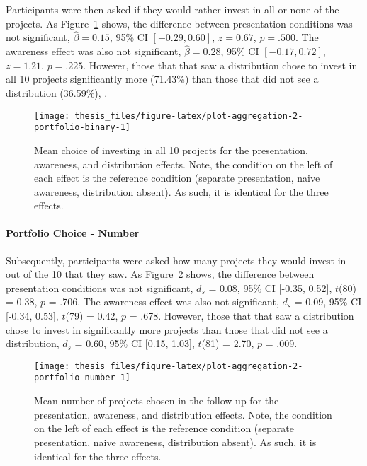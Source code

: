 \documentclass[a4paper, nobind]{templates/ociamthesis}
\theoremstyle{definition}
\theoremstyle{definition}
\theoremstyle{definition}
\theoremstyle{definition}
\theoremstyle{remark}
\begin{document}
Participants were then asked if they would rather invest in all or none of the
projects. As Figure~\ref{fig:plot-aggregation-2-portfolio-binary} shows, the
difference between presentation conditions was not significant,
\(\hat{\beta} = 0.15\), 95\% CI \([-0.29, 0.60]\), \(z = 0.67\), \(p = .500\). The
awareness effect was also not significant,
\(\hat{\beta} = 0.28\), 95\% CI \([-0.17, 0.72]\), \(z = 1.21\), \(p = .225\). However,
those that that saw a distribution chose to invest in all 10 projects
significantly more
(71.43\%) than
those that did not see a distribution
(36.59\%),
.



\begin{figure}
\texttt{[image: thesis\_files/figure-latex/plot-aggregation-2-portfolio-binary-1]} \caption{Mean choice of investing in all 10 projects for the presentation, awareness, and distribution effects. Note, the condition on the left of each effect is the reference condition (separate presentation, naive awareness, distribution absent). As such, it is identical for the three effects.}\label{fig:plot-aggregation-2-portfolio-binary}
\end{figure}

\paragraph{Portfolio Choice - Number}

Subsequently, participants were asked how many projects they would invest in out
of the 10 that they saw. As
Figure~\ref{fig:plot-aggregation-2-portfolio-number} shows, the difference
between presentation conditions was not significant,
\(d_s\) = 0.08, 95\% CI {[}-0.35, 0.52{]}, \(t\)(80) = 0.38, \(p\) = .706. The awareness effect
was also not significant, \(d_s\) = 0.09, 95\% CI {[}-0.34, 0.53{]}, \(t\)(79) = 0.42, \(p\) = .678.
However, those that that saw a distribution chose to invest in significantly
more projects than those that did not see a distribution,
\(d_s\) = 0.60, 95\% CI {[}0.15, 1.03{]}, \(t\)(81) = 2.70, \(p\) = .009.



\begin{figure}
\texttt{[image: thesis\_files/figure-latex/plot-aggregation-2-portfolio-number-1]} \caption{Mean number of projects chosen in the follow-up for the presentation, awareness, and distribution effects. Note, the condition on the left of each effect is the reference condition (separate presentation, naive awareness, distribution absent). As such, it is identical for the three effects.}\label{fig:plot-aggregation-2-portfolio-number}
\end{figure}
\end{document}
